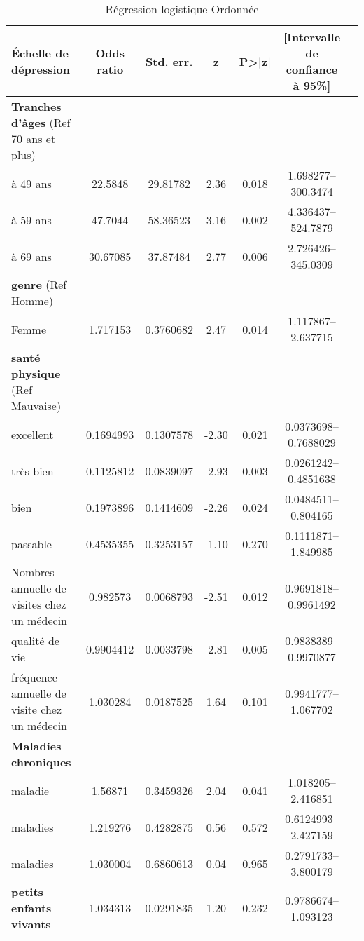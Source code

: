 \documentclass[a4paper]{article}
\begin{document}
\begin{table}[ht]
	\centering
	\caption{Régression logistique Ordonnée }
	\begin{tabular}{lcccccc}
		\toprule
		\textbf{Échelle de dépression} & \textbf{Odds ratio} & \textbf{Std. err.} & \textbf{z} & \textbf{P>|z|} & \textbf{[Intervalle de confiance à 95\%]} \\
		\midrule
		\textbf{Tranches d'âges} (Ref 70 ans et plus) & & & & & \\
		\quad 40 à 49 ans & 22.5848 & 29.81782 & 2.36 & 0.018 & 1.698277--300.3474 \\
		\quad 50 à 59 ans & 47.7044 & 58.36523 & 3.16 & 0.002 & 4.336437--524.7879 \\
		\quad 60 à 69 ans & 30.67085 & 37.87484 & 2.77 & 0.006 & 2.726426--345.0309 \\
		\textbf{genre} (Ref Homme) & & & & & \\
		\quad Femme & 1.717153 & 0.3760682 & 2.47 & 0.014 & 1.117867--2.637715 \\
		\textbf{santé physique} (Ref Mauvaise) & & & & & \\
		\quad excellent & 0.1694993 & 0.1307578 & -2.30 & 0.021 & 0.0373698--0.7688029 \\
		\quad très bien & 0.1125812 & 0.0839097 & -2.93 & 0.003 & 0.0261242--0.4851638 \\
		\quad bien & 0.1973896 & 0.1414609 & -2.26 & 0.024 & 0.0484511--0.804165 \\
		\quad passable & 0.4535355 & 0.3253157 & -1.10 & 0.270 & 0.1111871--1.849985 \\
		Nombres annuelle de visites chez un médecin & 0.982573 & 0.0068793 & -2.51 & 0.012 & 0.9691818--0.9961492 \\
		qualité de vie & 0.9904412 & 0.0033798 & -2.81 & 0.005 & 0.9838389--0.9970877 \\
		fréquence annuelle de visite chez un médecin & 1.030284 & 0.0187525 & 1.64 & 0.101 & 0.9941777--1.067702 \\
		\textbf{Maladies chroniques} & & & & & \\
		\quad 1 maladie & 1.56871 & 0.3459326 & 2.04 & 0.041 & 1.018205--2.416851 \\
		\quad 2 maladies & 1.219276 & 0.4282875 & 0.56 & 0.572 & 0.6124993--2.427159 \\
		\quad 3 maladies & 1.030004 & 0.6860613 & 0.04 & 0.965 & 0.2791733--3.800179 \\
		\textbf{petits enfants vivants} & 1.034313 & 0.0291835 & 1.20 & 0.232 & 0.9786674--1.093123 \\

\end{tabular}
\end{table}
\end{document}
